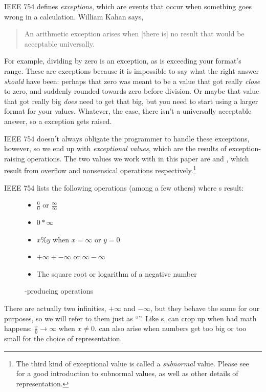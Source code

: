 \documentclass{juliacon}
\begin{document}
IEEE 754 defines \emph{\fp{} exceptions}, which are events that occur when something goes wrong in a calculation.
William Kahan says,

\begin{quote}
An arithmetic exception arises when [there is] no result that would be acceptable universally.
\end{quote}

For example, dividing by zero is an exception, as is exceeding your \fp{} format's range.
These are exceptions because it is impossible to say what the right answer \emph{should} have been: perhaps that zero was meant to be a value that got really \emph{close} to zero, and suddenly rounded towards zero before division.
Or maybe that value that got really big \emph{does} need to get that big, but you need to start using a larger format for your \fp{} values.
Whatever, the case, there isn't a universally acceptable answer, so a \fp{} exception gets raised.

IEEE 754 doesn't always obligate the programmer to handle these exceptions, however, so we end up with \emph{exceptional values}, which are the results of exception-raising operations.
The two values we work with in this paper are \Inf{} and \NaN{}, which result from overflow and nonsensical operations respectively.\footnote{The third kind of exceptional value is called a \emph{subnormal} value. Please see~\cite{torontoPracticallyAccurateFloatingPoint2014} for a good introduction to subnormal values, as well as other details of \fp{} representation.}

IEEE 754 lists the following operations (among a few others) where \NaN{}s result:

\begin{figure}[h]
  \label{fig:nan-gens}
  \begin{itemize}
  \item $\frac{0}{0}$ or $\frac{\infty}{\infty}$
  \item $0 * \infty$
  \item $x \% y$ when $x = \infty$ or $y = 0$
  \item $+\infty + -\infty$ or $\infty - \infty$
  \item The square root or logarithm of a negative number
  \end{itemize}
  \caption{\NaN{}-producing operations}
\end{figure}

There are actually two infinities, $+\infty$ and $-\infty$, but they behave the same for our purposes, so we will refer to them just as ``\Inf{}''.
Like \NaN{}s, \Inf{} can crop up when bad math happens: $\frac{x}{0} \rightarrow \infty$ when $x \ne 0$.
\Inf{} can also arise when numbers get too big or too small for the choice of representation.
\end{document}
